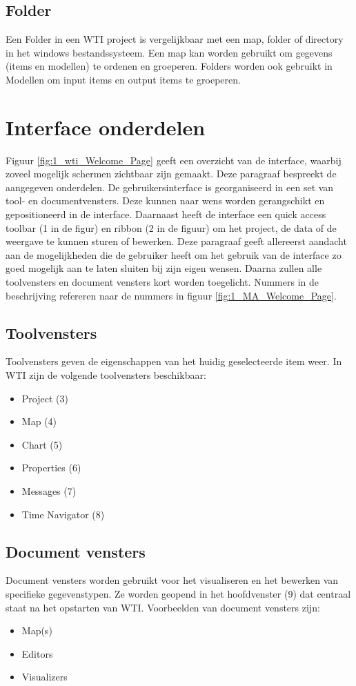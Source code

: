 \subsection{Folder}
Een Folder in een WTI project is vergelijkbaar met een map, folder of directory in het windows bestandssysteem. Een map kan worden gebruikt om gegevens (items en modellen) te ordenen en groeperen. Folders worden ook gebruikt in Modellen om input items en output items te groeperen.

\section{Interface onderdelen}
	\label{sec:DS:InterfaceOnderdelen}
Figuur \ref{fig:1_wti_Welcome_Page} geeft een overzicht van de interface, waarbij zoveel mogelijk schermen zichtbaar zijn gemaakt. Deze paragraaf bespreekt de aangegeven onderdelen. De gebruikersinterface is georganiseerd in een set van tool- en documentvensters. Deze kunnen naar wens worden gerangschikt en gepositioneerd in de interface. Daarnaast heeft de interface een quick access toolbar (1 in de figur) en ribbon (2 in de figuur) om het project, de data of de weergave te kunnen sturen of bewerken. Deze paragraaf geeft allereerst aandacht aan de mogelijkheden die de gebruiker heeft om het gebruik van de interface zo goed mogelijk aan te laten sluiten bij zijn eigen wensen. Daarna zullen alle toolvensters en document vensters kort worden toegelicht. Nummers in de beschrijving refereren naar de nummers in figuur \ref{fig:1_MA_Welcome_Page}.

\subsection*{Toolvensters}
Toolvensters geven de eigenschappen van het huidig geselecteerde item weer. In WTI zijn de volgende toolvensters beschikbaar:
\begin{itemize}
\item Project (3)
\item Map (4)
\item Chart (5)
\item Properties (6)
\item Messages (7)
\item Time Navigator (8)
\end{itemize}

\subsection*{Document vensters}
Document vensters worden gebruikt voor het visualiseren en het bewerken van specifieke gegevenstypen. Ze worden geopend in het hoofdvenster (9) dat centraal staat na het opstarten van WTI. Voorbeelden van document vensters zijn:
\begin{itemize}
\item Map(s)
\item Editors
\item Visualizers
\end{itemize}

